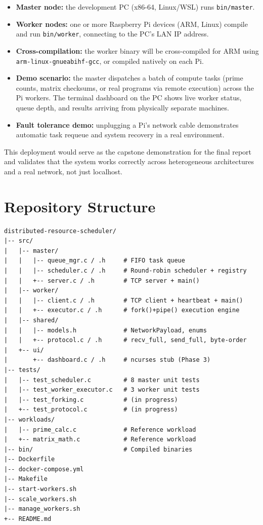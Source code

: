 \documentclass[12pt,a4paper]{article}
\begin{document}
\begin{itemize}[noitemsep]
    \item \textbf{Master node:} the development PC (x86-64, Linux/WSL) runs \texttt{bin/master}.
    \item \textbf{Worker nodes:} one or more Raspberry Pi devices (ARM, Linux) compile and run
          \texttt{bin/worker}, connecting to the PC's LAN IP address.
    \item \textbf{Cross-compilation:} the worker binary will be cross-compiled for ARM using
          \texttt{arm-linux-gnueabihf-gcc}, or compiled natively on each Pi.
    \item \textbf{Demo scenario:} the master dispatches a batch of compute tasks (prime counts,
          matrix checksums, or real programs via remote execution) across the Pi workers. The
          terminal dashboard on the PC shows live worker status, queue depth, and results
          arriving from physically separate machines.
    \item \textbf{Fault tolerance demo:} unplugging a Pi's network cable demonstrates automatic
          task requeue and system recovery in a real environment.
\end{itemize}

This deployment would serve as the capstone demonstration for the final report and
validates that the system works correctly across heterogeneous architectures and a real
network, not just localhost.


\section{Repository Structure}

\begin{lstlisting}[basicstyle=\ttfamily\small, frame=single, backgroundcolor=\color{gray!6}]
distributed-resource-scheduler/
|-- src/
|   |-- master/
|   |   |-- queue_mgr.c / .h     # FIFO task queue
|   |   |-- scheduler.c / .h     # Round-robin scheduler + registry
|   |   +-- server.c / .h        # TCP server + main()
|   |-- worker/
|   |   |-- client.c / .h        # TCP client + heartbeat + main()
|   |   +-- executor.c / .h      # fork()+pipe() execution engine
|   |-- shared/
|   |   |-- models.h             # NetworkPayload, enums
|   |   +-- protocol.c / .h      # recv_full, send_full, byte-order
|   +-- ui/
|       +-- dashboard.c / .h     # ncurses stub (Phase 3)
|-- tests/
|   |-- test_scheduler.c         # 8 master unit tests
|   |-- test_worker_executor.c   # 3 worker unit tests
|   |-- test_forking.c           # (in progress)
|   +-- test_protocol.c          # (in progress)
|-- workloads/
|   |-- prime_calc.c             # Reference workload
|   +-- matrix_math.c            # Reference workload
|-- bin/                         # Compiled binaries
|-- Dockerfile
|-- docker-compose.yml
|-- Makefile
|-- start-workers.sh
|-- scale_workers.sh
|-- manage_workers.sh
+-- README.md
\end{lstlisting}

\end{document}
